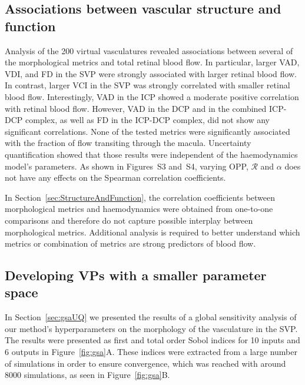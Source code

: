 \documentclass[11pt,]{article}
\begin{document}
\subsection{Associations between vascular structure and function}\label{sec:disc-results}

Analysis of the \SI{200}{} virtual vasculatures revealed associations between several of the morphological metrics and total retinal blood flow.
In particular, larger VAD, VDI, and FD in the SVP were strongly associated with larger retinal blood flow.
In contrast, larger VCI in the SVP was strongly correlated with smaller retinal blood flow.
Interestingly, VAD in the ICP showed a moderate positive correlation with retinal blood flow.
However, VAD in the DCP and in the combined ICP-DCP complex, as well as FD in the ICP-DCP complex, did not show any significant correlations.
None of the tested metrics were significantly associated with the fraction of flow transiting through the macula.
Uncertainty quantification showed that those results were independent of the haemodynamics model's parameters.
As shown in Figures~S3 and~S4, varying OPP, $\mathcal R$ and $\alpha$ does not have any effects on the Spearman correlation coefficients.

In Section~\ref{sec:StructureAndFunction}, the correlation coefficients between morphological metrics and haemodynamics were obtained from one-to-one comparisons and therefore do not capture possible interplay between morphological metrics.
Additional analysis is required to better understand which metrics or combination of metrics are strong predictors of blood flow.

\subsection{Developing VPs with a smaller parameter space}\label{sec:disc-gsa}

In Section~\ref{sec:gsaUQ} we presented the results of a global sensitivity analysis of our method's hyperparameters on the morphology of the vasculature in the SVP.
The results were presented as first and total order Sobol indices for 10 inputs and 6 outputs in Figure~\ref{fig:gsa}A.
These indices were extracted from a large number of simulations in order to ensure convergence, which was reached with around \SI{8000}{} simulations, as seen in Figure~\ref{fig:gsa}B.
\end{document}
